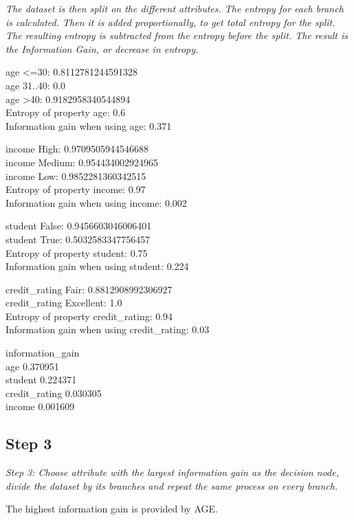 \documentclass[11pt,a4paper]{article}
\begin{document}
\textit{The dataset is then split on the different attributes. The entropy for each branch is calculated. Then it is added proportionally, to get total entropy for the split. The resulting entropy is subtracted from the entropy before the split. The result is the Information Gain, or decrease in entropy.}


age <=30:  0.8112781244591328\\
age 31..40:  0.0\\
age >40:  0.9182958340544894\\
Entropy of property age: 0.6\\
Information gain when using age:  0.371

income High:  0.9709505944546688\\
income Medium:  0.954434002924965\\
income Low:  0.9852281360342515\\
Entropy of property income: 0.97\\
Information gain when using income:  0.002

student False:  0.9456603046006401\\
student True:  0.5032583347756457\\
Entropy of property student: 0.75\\
Information gain when using student:  0.224

credit\_rating Fair:  0.8812908992306927\\
credit\_rating Excellent:  1.0\\
Entropy of property credit\_rating: 0.94\\
Information gain when using credit\_rating:  0.03

information\_gain\\
age                    0.370951\\
student                0.224371\\
credit\_rating          0.030305\\
income                 0.001609\\


\subsection*{Step 3}
\textit{Step 3: Choose attribute with the largest information gain as the decision node, divide the dataset by its branches and repeat the same process on every branch.}

The highest information gain is provided by AGE.
\end{document}
